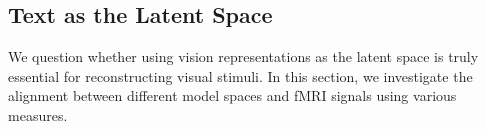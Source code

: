 



\subsection{Text as the Latent Space}
\label{sec:findings}
 We question whether using vision representations as the latent space is truly essential for reconstructing visual stimuli. In this section, we investigate the alignment between different model spaces and fMRI signals using various measures. 

